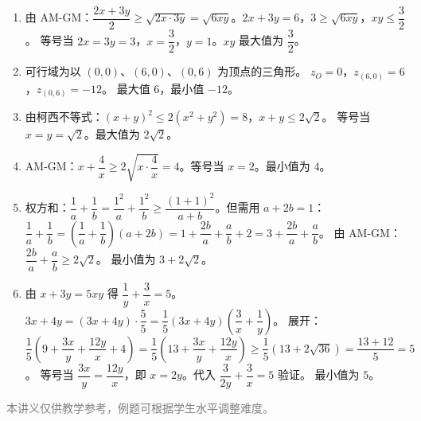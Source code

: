 \documentclass[12pt, a4paper]{ctexart}
\begin{document}
\begin{knowledgebox}[参考答案]
\begin{enumerate}
  \item 由 AM-GM：$\dfrac{2x + 3y}{2} \ge \sqrt{2x \cdot 3y} = \sqrt{6xy}$。$2x + 3y = 6$，$3 \ge \sqrt{6xy}$，$xy \le \dfrac{3}{2}$。
  等号当 $2x = 3y = 3$，$x = \dfrac{3}{2}$，$y = 1$。$xy$ 最大值为 $\boxed{\dfrac{3}{2}}$。

  \item 可行域为以 $(0,0)$、$(6,0)$、$(0,6)$ 为顶点的三角形。
  $z_O = 0$，$z_{(6,0)} = 6$，$z_{(0,6)} = -12$。
  最大值 $\boxed{6}$，最小值 $\boxed{-12}$。

  \item 由柯西不等式：$(x+y)^2 \le 2(x^2+y^2) = 8$，$x+y \le 2\sqrt{2}$。
  等号当 $x = y = \sqrt{2}$。最大值为 $\boxed{2\sqrt{2}}$。

  \item AM-GM：$x + \dfrac{4}{x} \ge 2\sqrt{x \cdot \dfrac{4}{x}} = 4$。等号当 $x = 2$。最小值为 $\boxed{4}$。

  \item 权方和：$\dfrac{1}{a} + \dfrac{1}{b} = \dfrac{1^2}{a} + \dfrac{1^2}{b} \ge \dfrac{(1+1)^2}{a+b}$。但需用 $a + 2b = 1$：
  $\dfrac{1}{a} + \dfrac{1}{b} = \left(\dfrac{1}{a} + \dfrac{1}{b}\right)(a + 2b) = 1 + \dfrac{2b}{a} + \dfrac{a}{b} + 2 = 3 + \dfrac{2b}{a} + \dfrac{a}{b}$。
  由 AM-GM：$\dfrac{2b}{a} + \dfrac{a}{b} \ge 2\sqrt{2}$。
  最小值为 $\boxed{3 + 2\sqrt{2}}$。

  \item 由 $x + 3y = 5xy$ 得 $\dfrac{1}{y} + \dfrac{3}{x} = 5$。
  $3x + 4y = (3x + 4y) \cdot \dfrac{5}{5} = \dfrac{1}{5}(3x + 4y)\left(\dfrac{3}{x} + \dfrac{1}{y}\right)$。
  展开：$\dfrac{1}{5}\left(9 + \dfrac{3x}{y} + \dfrac{12y}{x} + 4\right) = \dfrac{1}{5}\left(13 + \dfrac{3x}{y} + \dfrac{12y}{x}\right) \ge \dfrac{1}{5}(13 + 2\sqrt{36}) = \dfrac{13 + 12}{5} = 5$。
  等号当 $\dfrac{3x}{y} = \dfrac{12y}{x}$，即 $x = 2y$。代入 $\dfrac{3}{2y} + \dfrac{3}{x} = 5$ 验证。
  最小值为 $\boxed{5}$。
\end{enumerate}
\end{knowledgebox}

\vfill
\begin{center}
\small\textcolor{gray}{本讲义仅供教学参考，例题可根据学生水平调整难度。}
\end{center}
\end{document}
